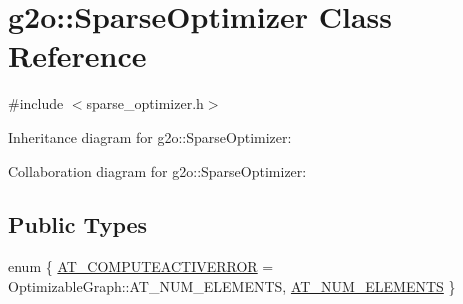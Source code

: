 \hypertarget{classg2o_1_1SparseOptimizer}{}\section{g2o\+:\+:Sparse\+Optimizer Class Reference}
\label{classg2o_1_1SparseOptimizer}


{\ttfamily \#include $<$sparse\+\_\+optimizer.\+h$>$}



Inheritance diagram for g2o\+:\+:Sparse\+Optimizer\+:


Collaboration diagram for g2o\+:\+:Sparse\+Optimizer\+:
\subsection*{Public Types}
\begin{DoxyCompactItemize}
\item 
enum \{ \hyperlink{classg2o_1_1SparseOptimizer_ae32133d08b51364935cfb34d612892b1a040ef6eacdbc7ede37bc5280dc5a2814}{A\+T\+\_\+\+C\+O\+M\+P\+U\+T\+E\+A\+C\+T\+I\+V\+E\+R\+R\+OR} = Optimizable\+Graph\+:\+:A\+T\+\_\+\+N\+U\+M\+\_\+\+E\+L\+E\+M\+E\+N\+TS, 
\hyperlink{classg2o_1_1SparseOptimizer_ae32133d08b51364935cfb34d612892b1a9e4fe5403aed6a2ac8b31651c9379098}{A\+T\+\_\+\+N\+U\+M\+\_\+\+E\+L\+E\+M\+E\+N\+TS}
 \}
\end{DoxyCompactItemize}
